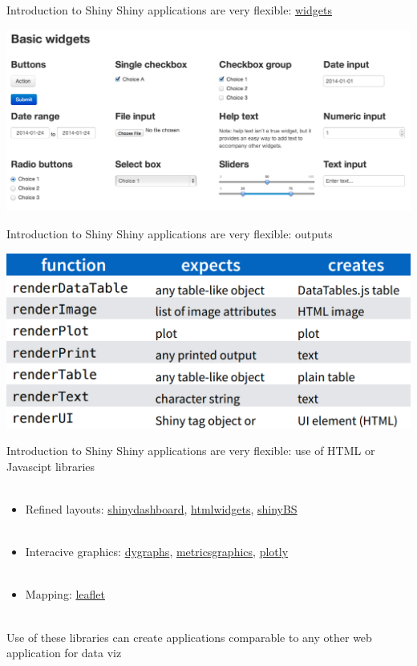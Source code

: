 \documentclass[serif]{beamer}\usepackage[]{graphicx}\usepackage[]{color}
\begin{document}
\begin{frame}[t]{Introduction to Shiny}
Shiny applications are very flexible: \href{http://shiny.rstudio.com/gallery/widget-gallery.html}{widgets}
\begin{center}
\includegraphics[width = \textwidth]{fig/widgets.png}
\end{center}
\end{frame}

\begin{frame}[t]{Introduction to Shiny}
Shiny applications are very flexible: outputs
\begin{center}
\includegraphics[width = \textwidth]{fig/outputs.png}
\end{center}
\end{frame}

\begin{frame}[t]{Introduction to Shiny}
Shiny applications are very flexible: use of HTML or Javascipt libraries \\~\\
\begin{itemize}
\item Refined layouts: \href{https://rstudio.github.io/shinydashboard/}{shinydashboard}, \href{http://www.htmlwidgets.org/}{htmlwidgets}, \href{https://ebailey78.github.io/shinyBS/}{shinyBS} \\~\\
\item Interacive graphics: \href{https://rstudio.github.io/dygraphs/}{dygraphs}, \href{http://hrbrmstr.github.io/metricsgraphics/}{metricsgraphics}, \href{https://plot.ly/r/shiny-tutorial/}{plotly} \\~\\
\item Mapping: \href{https://rstudio.github.io/leaflet/}{leaflet} \\~\\
\end{itemize}
Use of these libraries can create applications comparable to any other web application for data viz
\end{frame}
\end{document}
